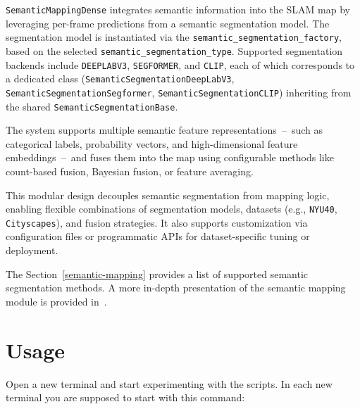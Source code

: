 \documentclass{article}
\begin{document}
\texttt{SemanticMappingDense} integrates semantic information into the SLAM map by leveraging per-frame predictions from a semantic segmentation model. The segmentation model is instantiated via the \texttt{semantic\_segmentation\_factory}, based on the selected \texttt{semantic\_segmentation\_type}. Supported segmentation backends include \texttt{DEEPLABV3}, \texttt{SEGFORMER}, and \texttt{CLIP}, each of which corresponds to a dedicated class (\texttt{SemanticSegmentationDeepLabV3}, \texttt{SemanticSegmentationSegformer}, \texttt{SemanticSegmentationCLIP}) inheriting from the shared \texttt{SemanticSegmentationBase}.

The system supports multiple semantic feature representations~--~such as categorical labels, probability vectors, and high-dimensional feature embeddings~--~and fuses them into the map using configurable methods like count-based fusion, Bayesian fusion, or feature averaging.

This modular design decouples semantic segmentation from mapping logic, enabling flexible combinations of segmentation models, datasets (e.g., \texttt{NYU40}, \texttt{Cityscapes}), and fusion strategies. It also supports customization via configuration files or programmatic APIs for dataset-specific tuning or deployment.

The Section~\ref{semantic-mapping} provides a list of supported semantic segmentation methods.
A more in-depth presentation of the semantic mapping module is provided in~\cite{pyslamSemantic2025}.




%

\FloatBarrier

\hypertarget{usage}{%
\section{Usage}\label{usage}}

Open a new terminal and start experimenting with the scripts. In each
new terminal you are supposed to start with this command:
\end{document}

